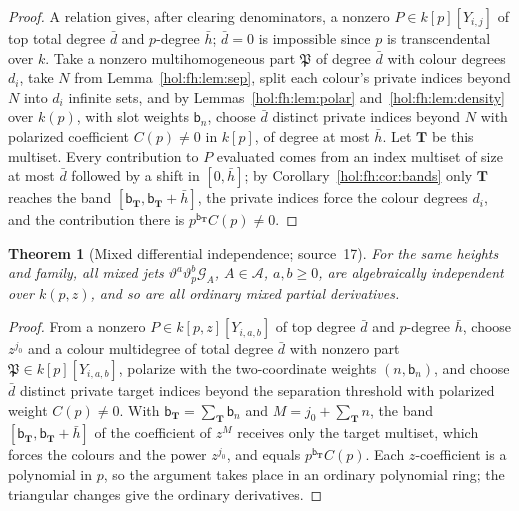 \documentclass[11pt]{article}
\numberwithin{equation}{section}
\newtheorem{theorem}{Theorem}[section]
\theoremstyle{definition}
\theoremstyle{remark}
\begin{document}
\begin{proof}
A relation gives, after clearing denominators, a nonzero $P\in k[p][Y_{i,j}]$
of top total degree $\bar d$ and $p$-degree $\bar h$; $\bar d=0$ is impossible
since $p$ is transcendental over $k$. Take a nonzero multihomogeneous part
$\mathfrak P$ of degree $\bar d$ with colour degrees $d_i$, take $N$ from
Lemma~\ref{hol:fh:lem:sep}, split each colour's private indices beyond $N$
into $d_i$ infinite sets, and by Lemmas~\ref{hol:fh:lem:polar}
and~\ref{hol:fh:lem:density} over $k(p)$, with slot weights $\mathsf b_n$,
choose $\bar d$ distinct private indices beyond $N$ with polarized
coefficient $C(p)\ne0$ in $k[p]$, of degree at most $\bar h$. Let $\mathbf T$
be this multiset. Every contribution to $P$ evaluated comes from an index
multiset of size at most $\bar d$ followed by a shift in $[0,\bar h]$; by
Corollary~\ref{hol:fh:cor:bands} only $\mathbf T$ reaches the band
$[\mathsf b_{\mathbf T},\mathsf b_{\mathbf T}+\bar h]$, the private indices force
the colour degrees $d_i$, and the contribution there is
$p^{\mathsf b_{\mathbf T}}C(p)\ne0$.
\end{proof}

\begin{theorem}[Mixed differential independence; source~17]
\label{hol:fh:thm:mixed}
For the same heights and family, all mixed jets
$\vartheta^a\vartheta_p^b\mathcal G_A$, $A\in\mathcal A$, $a,b\ge0$, are
algebraically independent over $k(p,z)$, and so are all ordinary mixed
partial derivatives.
\end{theorem}

\begin{proof}
From a nonzero $P\in k[p,z][Y_{i,a,b}]$ of top degree $\bar d$ and $p$-degree
$\bar h$, choose $z^{j_0}$ and a colour multidegree of total degree $\bar d$
with nonzero part $\mathfrak P\in k[p][Y_{i,a,b}]$, polarize with the
two-coordinate weights $(n,\mathsf b_n)$, and choose $\bar d$ distinct private
target indices beyond the separation threshold with polarized weight
$C(p)\ne0$. With $\mathsf b_{\mathbf T}=\sum_{\mathbf T}\mathsf b_n$ and
$M=j_0+\sum_{\mathbf T}n$, the band $[\mathsf b_{\mathbf T},\mathsf b_{\mathbf T}+
\bar h]$ of the coefficient of $z^M$ receives only the target multiset, which
forces the colours and the power $z^{j_0}$, and equals
$p^{\mathsf b_{\mathbf T}}C(p)$. Each $z$-coefficient is a polynomial in $p$, so
the argument takes place in an ordinary polynomial ring; the triangular
changes give the ordinary derivatives.
\end{proof}
\end{document}
